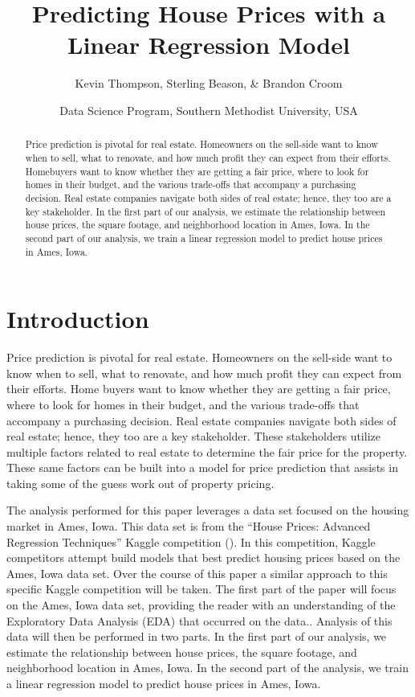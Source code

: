 \documentclass[american,]{article}
\title{Predicting House Prices with a Linear Regression Model}
\author{Kevin Thompson, Sterling Beason, \& Brandon Croom}
\date{Data Science Program, Southern Methodist University, USA \break}
\begin{document}
\maketitle
\begin{abstract}
Price prediction is pivotal for real estate. Homeowners on the sell-side
want to know when to sell, what to renovate, and how much profit they
can expect from their efforts. Homebuyers want to know whether they are
getting a fair price, where to look for homes in their budget, and the
various trade-offs that accompany a purchasing decision. Real estate
companies navigate both sides of real estate; hence, they too are a key
stakeholder. In the first part of our analysis, we estimate the
relationship between house prices, the square footage, and neighborhood
location in Ames, Iowa. In the second part of our analysis, we train a
linear regression model to predict house prices in Ames, Iowa.
\end{abstract}

\section{Introduction}\label{introduction}

Price prediction is pivotal for real estate. Homeowners on the sell-side
want to know when to sell, what to renovate, and how much profit they
can expect from their efforts. Home buyers want to know whether they are
getting a fair price, where to look for homes in their budget, and the
various trade-offs that accompany a purchasing decision. Real estate
companies navigate both sides of real estate; hence, they too are a key
stakeholder. These stakeholders utilize multiple factors related to real
estate to determine the fair price for the property. These same factors
can be built into a model for price prediction that assists in taking
some of the guess work out of property pricing.

The analysis performed for this paper leverages a data set focused on
the housing market in Ames, Iowa. This data set is from the ``House
Prices: Advanced Regression Techniques'' Kaggle competition
(\citet{Kaggle2016}). In this competition, Kaggle competitors attempt
build models that best predict housing prices based on the Ames, Iowa
data set. Over the course of this paper a similar approach to this
specific Kaggle competition will be taken. The first part of the paper
will focus on the Ames, Iowa data set, providing the reader with an
understanding of the Exploratory Data Analysis (EDA) that occurred on
the data.. Analysis of this data will then be performed in two parts. In
the first part of our analysis, we estimate the relationship between
house prices, the square footage, and neighborhood location in Ames,
Iowa. In the second part of the analysis, we train a linear regression
model to predict house prices in Ames, Iowa.
\end{document}
